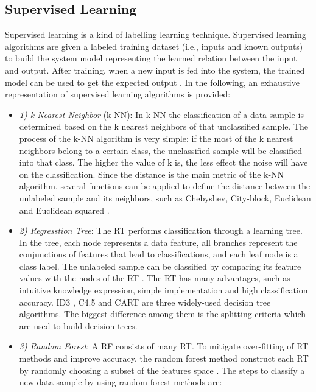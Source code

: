 \subsection{Supervised Learning}
Supervised learning is a kind of labelling learning technique. Supervised learning algorithms are given a labeled training dataset (i.e., inputs and known outputs) to build the system model representing the learned relation between the input and output. After training, when a new input is fed into the system, the trained model can be used to get the expected output \cite{Kotsiantis2007, Hastie2009}. In the following, an exhaustive representation of supervised learning algorithms is provided:
\begin{itemize}
\item[]\textit{1) k-Nearest Neighbor} (k-NN): In k-NN the classification of a data sample is determined based on the k nearest neighbors of that unclassified sample. The process of the k-NN algorithm is very simple: if the most of the k nearest neighbors belong to a certain class, the unclassified sample will be classified into that class. The higher the value of k is, the less effect the noise will have on the classification. Since the distance is the main metric of the k-NN algorithm, several functions can be applied to define the distance between the unlabeled sample and its neighbors, such as Chebyshev, City-block, Euclidean and Euclidean squared \cite{Cover1967}.
\item[]\textit{2) Regresstion Tree}: The RT performs classification through a learning tree. In the tree, each node represents a data feature, all branches represent the conjunctions of features that lead to classifications, and each leaf node is a class label. The unlabeled sample can be classified by comparing its feature values with the nodes of the RT \cite{Han2011}. The RT has many advantages, such as intuitive knowledge expression, simple implementation and high classification accuracy. ID3 \cite{Quinlan1986}, C4.5 \cite{Karatsiolis2012} and CART \cite{Burrows1995} are three widely-used decision tree algorithms. The biggest difference among them is the splitting criteria which are used to build decision trees. 
\item[]\textit{3) Random Forest}: A RF \cite{Breiman1999} consists of many RT. To mitigate over-fitting of RT methods and improve accuracy, the random forest method construct each RT by randomly choosing a subset of the features space . The steps to classify a new data sample by using random forest methods are:
\begin{itemize}

\end{itemize}
\end{itemize}
